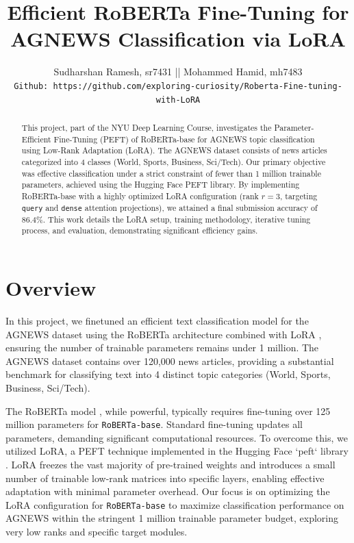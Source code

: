 \documentclass[twoside, 11pt]{article}
\begin{document}
\title{Efficient RoBERTa Fine-Tuning for AGNEWS Classification via LoRA}
\author{Sudharshan Ramesh, sr7431 ||
Mohammed Hamid, mh7483\\
\texttt{Github: https://github.com/exploring-curiosity/Roberta-Fine-tuning-with-LoRA}
}
\maketitle

\begin{abstract}
This project, part of the NYU Deep Learning Course, investigates the Parameter-Efficient Fine-Tuning (PEFT) of RoBERTa-base for AGNEWS topic classification using Low-Rank Adaptation (LoRA). The AGNEWS dataset consists of news articles categorized into 4 classes (World, Sports, Business, Sci/Tech). Our primary objective was effective classification under a strict constraint of fewer than 1 million trainable parameters, achieved using the Hugging Face PEFT library. By implementing RoBERTa-base with a highly optimized LoRA configuration (rank $r=3$, targeting \texttt{query} and \texttt{dense} attention projections), we attained a final submission accuracy of 86.4\%. This work details the LoRA setup, training methodology, iterative tuning process, and evaluation, demonstrating significant efficiency gains.
\end{abstract}

\section{Overview}
\label{sec:intro}
In this project, we finetuned an efficient text classification model for the AGNEWS dataset using the RoBERTa architecture combined with LoRA \cite{hu2021lora} , ensuring the number of trainable parameters remains under 1 million. The AGNEWS dataset contains over 120,000 news articles, providing a substantial benchmark for classifying text into 4 distinct topic categories (World, Sports, Business, Sci/Tech).

The RoBERTa model \cite{liu2019roberta}, while powerful, typically requires fine-tuning over 125 million parameters for \texttt{RoBERTa-base}. Standard fine-tuning updates all parameters, demanding significant computational resources. To overcome this, we utilized LoRA, a PEFT technique implemented in the Hugging Face `peft` library \cite{peft}. LoRA freezes the vast majority of pre-trained weights and introduces a small number of trainable low-rank matrices into specific layers, enabling effective adaptation with minimal parameter overhead. Our focus is on optimizing the LoRA configuration for \texttt{RoBERTa-base} to maximize classification performance on AGNEWS within the stringent 1 million trainable parameter budget, exploring very low ranks and specific target modules.
\end{document}
